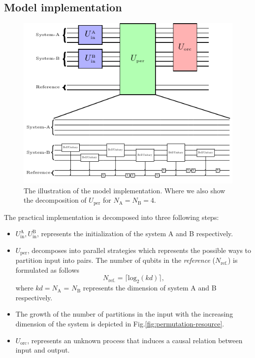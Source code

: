 \subsection{Model implementation}

\begin{figure}[tbh!]
    \centering
    \includegraphics[width = 0.9\linewidth]{plot/bortoni.pdf}
    \caption{The illustration of the model implementation. Where we also show the decomposition of $U_\textrm{per}$ for $ N_\textrm{A} = N_\textrm{B} = 4$.}
    \label{fig:perm-circuit}
\end{figure}
The practical implementation is decomposed into three following steps:
\begin{itemize}
    \item $ U_\textrm{in}^\textrm{A}, U_\textrm{in}^\textrm{B} $, represents the initialization of the system A and B respectively.
    \item $U_\textrm{per}$, decomposes into parallel strategies which represents the possible ways to partition input into pairs.
    The number of qubits in the \textit{reference} ($N_{\textrm{ref.}}$) is formulated as follows
    \begin{equation}
        N_{\textrm{ref.}} = \lceil \textrm{log}_2 (kd) \rceil,
    \end{equation}
    where $kd = N_\textrm{A}$ = $N_\textrm{B}$ represents the dimension of system A and B respectively.
    \item The growth of the number of partitions in the input with the increasing dimension of the system is depicted in Fig.\ref{fig:permutation-resource}.
    \item $U_\textrm{orc}$, represents an unknown process that induces a causal relation between input and output.
\end{itemize}
